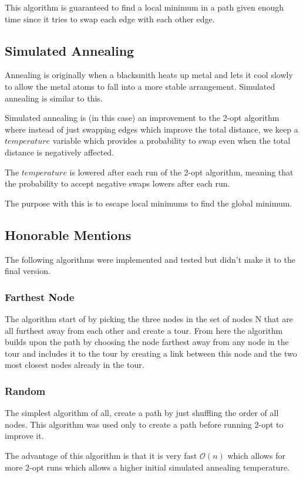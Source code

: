 \documentclass{article}[11pt, a4paper]
\begin{document}
This algorithm is guaranteed to find a local minimum in a path given enough time since it tries to swap each edge with each other edge.

\subsection{Simulated Annealing}
Annealing is originally when a blacksmith heats up metal and lets it cool slowly to allow the metal atoms to fall into a more stable arrangement. Simulated annealing is similar to this.

Simulated annealing is (in this case) an improvement to the 2-opt algorithm where instead of just swapping edges which improve the total distance, we keep a $temperature$ variable which provides a probability to swap even when the total distance is negatively affected. 

The $temperature$ is lowered after each run of the 2-opt algorithm, meaning that the probability to accept negative swaps lowers after each run.

The purpose with this is to escape local minimums to find the global minimum.

\subsection{Honorable Mentions}
The following algorithms were implemented and tested but didn't make it to the final version. 

\subsubsection{Farthest Node}
The algorithm start of by picking the three nodes in the set of nodes N that are all furthest away from each other and create a tour. From here the algorithm builds upon the path by choosing the node farthest away from any node in the tour and includes it to the tour by creating a link between this node and the two most closest nodes already in the tour.

\subsubsection{Random}
The simplest algorithm of all, create a path by just shuffling the order of all nodes. 
This algorithm was used only to create a path before running 2-opt to improve it.

The advantage of this algorithm is that it is very fast $\mathcal{O}(n)$ which allows for more 2-opt runs which allows a higher initial simulated annealing temperature.
\end{document}
